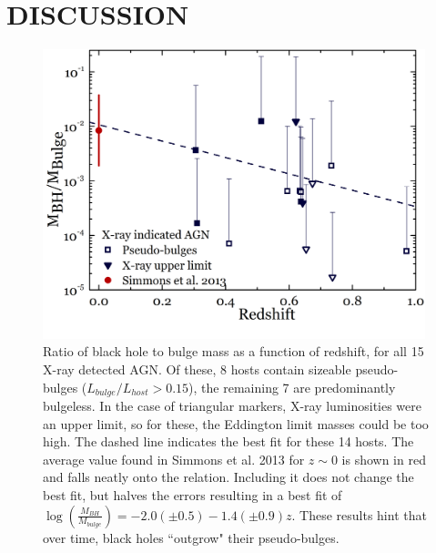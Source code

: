 \documentclass[11pt,twocolumn]{article}
\begin{document}
\section{\normalsize DISCUSSION}\label{discussion}

\begin{figure}[!t]
\includegraphics[width=0.99\textwidth]{Graph3}
\caption{Ratio of black hole to bulge mass as a function of redshift, for all 15 X-ray detected AGN. Of these, 8 hosts contain sizeable pseudo-bulges ($L_{bulge}/L_{host} >  0.15$), the remaining 7 are predominantly bulgeless. In the case of triangular markers, X-ray luminosities were an upper limit, so for these, the Eddington limit masses could be too high. The dashed line indicates the best fit for these 14 hosts. The average value found in Simmons et al. 2013 for $z\sim 0$  is shown in red and falls neatly onto the relation. Including it does not change the best fit, but halves the errors resulting in a best fit of $\log{( \frac{M_{BH}}{M_{bulge}} )} =  -2.0 (\pm 0.5) - 1.4 (\pm 0.9) z $. These results hint that over time, black holes ``outgrow" their pseudo-bulges.}\label{plot2}
\end{figure}

\end{document}
